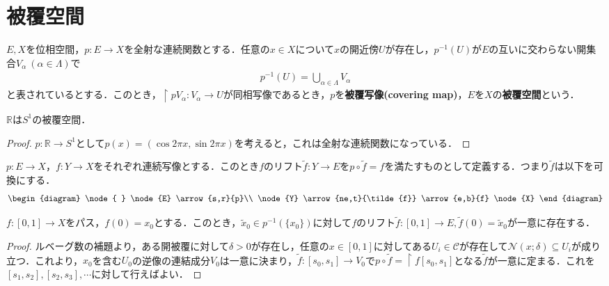 \documentclass[uplatex]{jsarticle}
\begin{document}
\fi

\section{被覆空間}
\begin{teigi}[被覆空間]
  $E,X$を位相空間，$p\colon E \to X$を全射な連続関数とする．任意の$x\in X$について$x$の開近傍$U$が存在し，$p^{-1}(U)$が$E$の互いに交わらない開集合$V_\alpha\ (\alpha \in \Lambda)$で
  \begin{align*}
    p^{-1}(U) = \bigcup_{\alpha \in \Lambda} V_\alpha
  \end{align*}
  と表されているとする．このとき，$\restriction{p}{V_\alpha} \colon V_\alpha \to U$が同相写像であるとき，$p$を\textbf{被覆写像(covering map)}，$E$を$X$の\textbf{被覆空間}という．
\end{teigi}

\begin{rei}
  $\mathbb{R}$は$S^1$の被覆空間．
\end{rei}
\begin{proof}
  $p\colon \mathbb{R} \to S^1$として$p(x) = (\cos 2\pi x,\sin 2\pi x)$を考えると，これは全射な連続関数になっている．
\end{proof}

\begin{teigi}[リフト]
  $p\colon E\to X$，$f\colon Y\to X$をそれぞれ連続写像とする．このとき$f$のリフト$\tilde{f}\colon Y\to E$を$p\circ \tilde{f} = f$を満たすものとして定義する．つまり$\tilde{f}$は以下を可換にする．
  \begin{align*}
    \begin{diagram}
      \node{ } \node{E} \arrow{s,r}{p}\\
      \node{Y} \arrow{ne,t}{\tilde{f}} \arrow{e,b}{f} \node{X}
    \end{diagram}
  \end{align*}
\end{teigi}

\begin{teiri}
  $f\colon \left[0,1\right]\to X$をパス，$f(0)=x_0$とする．このとき，$\tilde{x}_0 \in p^{-1}(\{x_0\})$に対して$f$のリフト$\tilde{f}\colon \left[0,1\right]\to E,\tilde{f}(0)=\tilde{x}_0$が一意に存在する．
\end{teiri}
\begin{proof}
  ルベーグ数の補題より，ある開被覆に対して$\delta > 0$が存在し，任意の$x \in \left[0,1\right]$に対してある$U_i \in\mathcal{C}$が存在して$\mathcal{N}(x;\delta) \subseteq U_i$が成り立つ．これより，$x_0$を含む$U_0$の逆像の連結成分$V_0$は一意に決まり，$\tilde{f}\colon \left[s_0,s_1\right]\to V_0$で$p\circ \tilde{f} = \restriction{f}{\left[s_0,s_1\right]}$となる$\tilde{f}$が一意に定まる．これを$\left[s_1,s_2\right],\left[s_2,s_3\right],\cdots$に対して行えばよい．
\end{proof}
\end{document}
